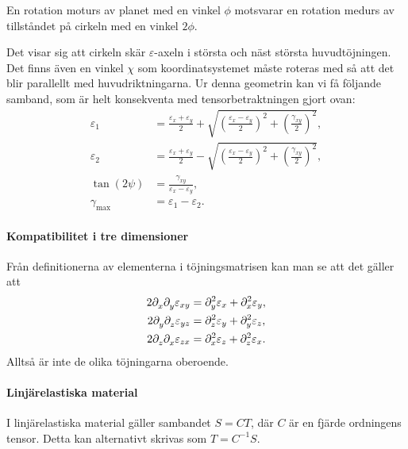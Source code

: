 En rotation moturs av planet med en vinkel $\phi$ motsvarar en rotation medurs av tillståndet på cirkeln med en vinkel $2\phi$.

Det visar sig att cirkeln skär $\varepsilon$-axeln i största och näst största huvudtöjningen. Det finns även en vinkel $\chi$ som koordinatsystemet måste roteras med så att det blir parallellt med huvudriktningarna. Ur denna geometrin kan vi få följande samband, som är helt konsekventa med tensorbetraktningen gjort ovan:
\begin{align*}
	\varepsilon_{1}     &= \frac{\varepsilon_{x} + \varepsilon_{y}}{2} + \sqrt{\left(\frac{\varepsilon_{x} - \varepsilon_{y}}{2}\right)^{2} + \left(\frac{\gamma_{xy}}{2}\right)^{2}}, \\
	\varepsilon_{2}     &= \frac{\varepsilon_{x} + \varepsilon_{y}}{2} - \sqrt{\left(\frac{\varepsilon_{x} - \varepsilon_{y}}{2}\right)^{2} + \left(\frac{\gamma_{xy}}{2}\right)^{2}}, \\
	\tan(2\psi)         &= \frac{\gamma_{xy}}{\varepsilon_{x} - \varepsilon_{y}}, \\
	\gamma_{\text{max}} &= \varepsilon_{1} - \varepsilon_{2}.
\end{align*}

\paragraph{Kompatibilitet i tre dimensioner}
Från definitionerna av elementerna i töjningsmatrisen kan man se att det gäller att
\begin{align*}
	2\del{x}{\del{y}{\varepsilon_{xy}}} &= \del[2]{y}{\varepsilon_{x}} + \del[2]{x}{\varepsilon_{y}}, \\
	2\del{y}{\del{z}{\varepsilon_{yz}}} &= \del[2]{z}{\varepsilon_{y}} + \del[2]{y}{\varepsilon_{z}}, \\
	2\del{z}{\del{x}{\varepsilon_{zx}}} &= \del[2]{x}{\varepsilon_{z}} + \del[2]{z}{\varepsilon_{x}}.
\end{align*}
Alltså är inte de olika töjningarna oberoende.

\paragraph{Linjärelastiska material}
I linjärelastiska material gäller sambandet $S = CT$, där $C$ är en fjärde ordningens tensor. Detta kan alternativt skrivas som $T = C^{-1}S$.

